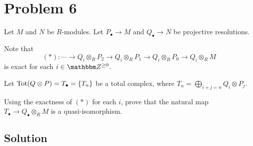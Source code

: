 \section*{Problem 6}

Let \(M\) and \(N\) be \(R\)-modules.
Let \(P_\bullet \to M\) and \(Q_\bullet \to N\) be projective resolutions.

Note that
\[(*):
  \cdots
  \to Q_i \otimes_R P_2
  \to Q_i \otimes_R P_1
  \to Q_i \otimes_R P_0
  \to Q_i \otimes_R M
\]
is exact for each \(i \in \bbZ^{\ge 0}\).

Let \(\textnormal{Tot}(Q \otimes P) = T_\bullet = \{T_n\}\) be a total complex,
where \(T_n = \bigoplus_{i + j = n} Q_i \otimes P_j\).

Using the exactness of \((*)\) for each \(i\),
prove that the natural map
\(T_\bullet \to Q_\bullet \otimes_R M\)
is a quasi-isomorphism.

\subsection*{Solution}